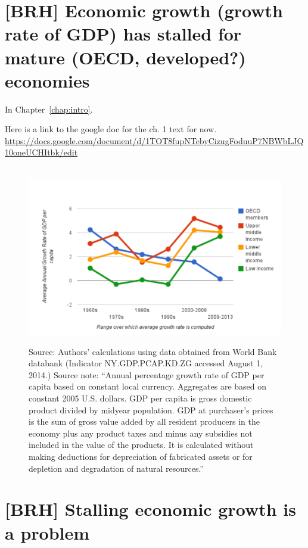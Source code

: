\section{[BRH] Economic growth (growth rate of GDP) has stalled for mature (OECD, developed?) economies}
\label{sec:growth_has_slowed}

In Chapter~\ref{chap:intro}.

Here is a link to the google doc for the ch. 1 text for now.
\url{https://docs.google.com/document/d/1TOT8fupNTebyCizugFoduuP7NBWbLJQ10oneUCHItbk/edit}


\begin{figure}[!ht]
\centering\
\includegraphics[width=\linewidth]{Part_0/Chapter_Introduction/images/GDPPC.pdf}
\caption[The traditional model]{Source: Authors' calculations using 
data obtained from World Bank databank (Indicator NY.GDP.PCAP.KD.ZG accessed August 1, 2014.)
Source note: ``Annual percentage growth rate of GDP per capita based on constant local currency. Aggregates are based on constant 2005 U.S. dollars. GDP per capita is gross domestic product divided by midyear population. GDP at purchaser's prices is the sum of gross value added by all resident producers in the economy plus any product taxes and minus any subsidies not included in the value of the products. It is calculated without making deductions for depreciation of fabricated assets or for depletion and degradation of natural resources.''}
\label{fig:gdppc}
\end{figure}


\section{[BRH] Stalling economic growth is a problem}
\label{sec:stall_is_a_problem}

